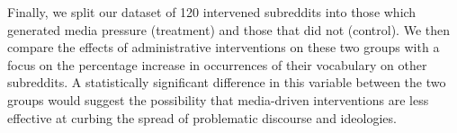  Finally, we split our dataset of
120 intervened subreddits into those which generated media pressure (treatment)
and those that did not (control). We then compare the effects of administrative
interventions on these two groups with a focus on the percentage increase in
occurrences of their vocabulary on other subreddits. A statistically
significant difference in this variable between the two groups would suggest
the possibility that media-driven interventions are less effective at curbing
the spread of problematic discourse and ideologies.


% 
